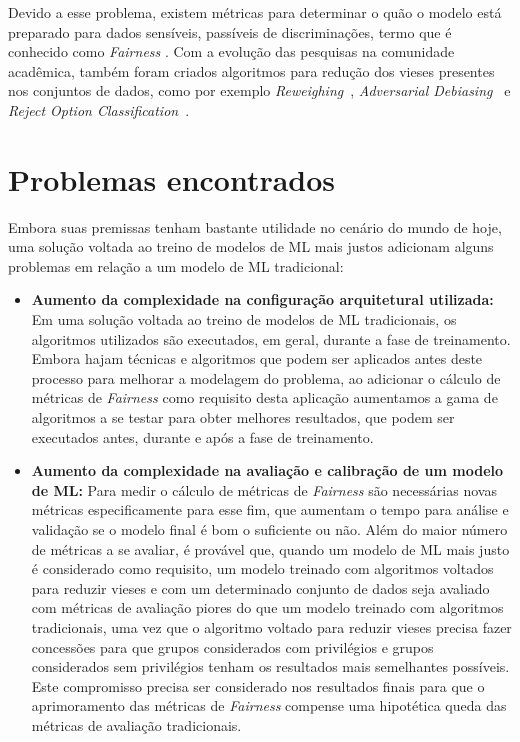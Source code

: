 \documentclass[portugues]{ic-tese}
\begin{document}
Devido a esse problema, existem métricas para determinar o quão o modelo está preparado para dados sensíveis, passíveis de discriminações, termo que é conhecido como \textit{Fairness} \citep{Begley_2021}. Com a evolução das pesquisas na comunidade acadêmica, também foram criados algoritmos para redução dos vieses presentes nos conjuntos de dados, como por exemplo \textit{Reweighing}~\citep{Kamiran_2011}, \textit{Adversarial Debiasing}~\citep{Zhang_2018} e \textit{Reject Option Classification}~\citep{Kamiran_2012}.

\section{Problemas encontrados}

Embora suas premissas tenham bastante utilidade no cenário do mundo de hoje, uma solução voltada ao treino de modelos de ML mais justos adicionam alguns problemas em relação a um modelo de ML tradicional:

\begin{itemize}
\item \textbf{Aumento da complexidade na configuração arquitetural utilizada:} Em uma solução voltada ao treino de modelos de ML tradicionais, os algoritmos utilizados são executados, em geral, durante a fase de treinamento. Embora hajam técnicas e algoritmos que podem ser aplicados antes deste processo para melhorar a modelagem do problema, ao adicionar o cálculo de métricas de \textit{Fairness} como requisito desta aplicação aumentamos a gama de algoritmos a se testar para obter melhores resultados, que podem ser executados antes, durante e após a fase de treinamento.
\item \textbf{Aumento da complexidade na avaliação e calibração de um modelo de ML:} Para medir o cálculo de métricas de \textit{Fairness} são necessárias novas métricas especificamente para esse fim, que aumentam o tempo para análise e validação se o modelo final é bom o suficiente ou não. Além do maior número de métricas a se avaliar, é provável que, quando um modelo de ML mais justo é considerado como requisito, um modelo treinado com algoritmos voltados para reduzir vieses e com um determinado conjunto de dados seja avaliado com métricas de avaliação piores do que um modelo treinado com algoritmos tradicionais, uma vez que o algoritmo voltado para reduzir vieses precisa fazer concessões para que grupos considerados com privilégios e grupos considerados sem privilégios tenham os resultados mais semelhantes possíveis. Este compromisso precisa ser considerado nos resultados finais para que o aprimoramento das métricas de \textit{Fairness} compense uma hipotética queda das métricas de avaliação tradicionais.
\end{itemize}
\end{document}
